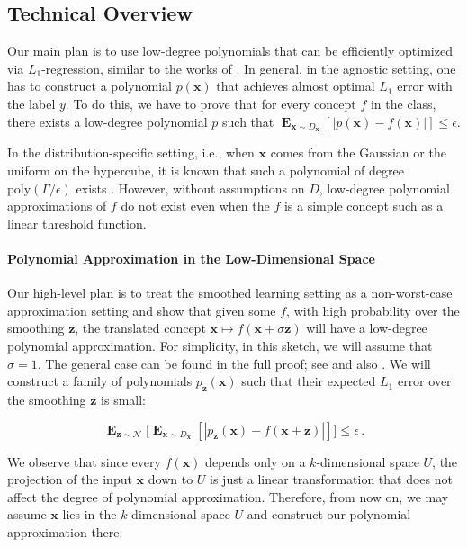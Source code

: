 \documentclass[10pt,a4paper]{article}
\DeclareMathOperator*{\E}{\mathbf{E}}
\newcommand{\1}{\Ind}
\begin{document}
\subsection{Technical Overview}
\label{sec:techniques}



Our main plan is to use low-degree polynomials that can be efficiently optimized via $L_1$-regression, similar to the works of \cite{KKMS:05, KOS:08}. In general, in the agnostic setting, one has to construct a polynomial $p(\mathbf{x})$ that achieves almost optimal $L_1$ error with the label $y$. To do this, we have to prove that for every concept $f$ in the class, there exists a low-degree polynomial $p$ such that ${\E}_{\mathbf{x} \sim D_{\mathbf{x}}} [|p(\mathbf{x}) - f(\mathbf{x})|] \leq \epsilon$.

In the distribution-specific setting, i.e., when $\mathbf{x}$ comes from the Gaussian or the uniform on the hypercube, it is known that such a polynomial of degree $\text{poly}(\Gamma/\epsilon)$ exists \cite{KOS:08}. However, without assumptions on $D$, low-degree polynomial approximations of $f$ do not exist even when the $f$ is a simple concept such as a linear threshold function.

\paragraph{Polynomial Approximation in the Low-Dimensional Space}

Our high-level plan is to treat the smoothed learning setting as a non-worst-case approximation setting and show that given some $f$, with high probability over the smoothing $\mathbf{z}$, the translated concept $\mathbf{x} \mapsto f(\mathbf{x} + \sigma \mathbf{z})$ will have a low-degree polynomial approximation. For simplicity, in this sketch, we will assume that $\sigma = 1$. The general case can be found in the full proof; see  and also . We will construct a family of polynomials $p_{\mathbf{z}}(\mathbf{x})$ such that their expected $L_1$ error over the smoothing $\mathbf{z}$ is small:

\[
\E_{\mathbf{z} \sim \mathcal{N}}\Big[ \E_{\mathbf{x} \sim D_{\mathbf{x}}} [|p_{\mathbf{z}}(\mathbf{x}) - f(\mathbf{x} + \mathbf{z})|] \Big] \leq \epsilon\,.
\]

We observe that since every $f(\mathbf{x})$ depends only on a $k$-dimensional space $U$, the projection of the input $\mathbf{x}$ down to $U$ is just a linear transformation that does not affect the degree of polynomial approximation. Therefore, from now on, we may assume $\mathbf{x}$ lies in the $k$-dimensional space $U$ and construct our polynomial approximation there.
\end{document}
